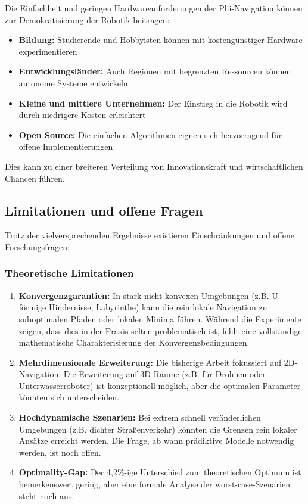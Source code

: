 ﻿\documentclass[a4paper,12pt]{article}
\theoremstyle{definition}
\begin{document}
Die Einfachheit und geringen Hardwareanforderungen der Phi-Navigation können zur Demokratisierung der Robotik beitragen:

\begin{itemize}
	\item \textbf{Bildung:} Studierende und Hobbyisten können mit kostengünstiger Hardware experimentieren
	\item \textbf{Entwicklungsländer:} Auch Regionen mit begrenzten Ressourcen können autonome Systeme entwickeln
	\item \textbf{Kleine und mittlere Unternehmen:} Der Einstieg in die Robotik wird durch niedrigere Kosten erleichtert
	\item \textbf{Open Source:} Die einfachen Algorithmen eignen sich hervorragend für offene Implementierungen
\end{itemize}

Dies kann zu einer breiteren Verteilung von Innovationskraft und wirtschaftlichen Chancen führen.

\subsection{Limitationen und offene Fragen}

Trotz der vielversprechenden Ergebnisse existieren Einschränkungen und offene Forschungsfragen:

\subsubsection{Theoretische Limitationen}

\begin{enumerate}
	\item \textbf{Konvergenzgarantien:} In stark nicht-konvexen Umgebungen (z.B. U-förmige Hindernisse, Labyrinthe) kann die rein lokale Navigation zu suboptimalen Pfaden oder lokalen Minima führen. Während die Experimente zeigen, dass dies in der Praxis selten problematisch ist, fehlt eine vollständige mathematische Charakterisierung der Konvergenzbedingungen.
	
	\item \textbf{Mehrdimensionale Erweiterung:} Die bisherige Arbeit fokussiert auf 2D-Navi\-gation. Die Erweiterung auf 3D-Räume (z.B. für Drohnen oder Unterwasserroboter) ist konzeptionell möglich, aber die optimalen Parameter könnten sich unterscheiden.
	
	\item \textbf{Hochdynamische Szenarien:} Bei extrem schnell veränderlichen Umgebungen (z.B. dichter Straßenverkehr) könnten die Grenzen rein lokaler Ansätze erreicht werden. Die Frage, ab wann prädiktive Modelle notwendig werden, ist noch offen.
	
	\item \textbf{Optimality-Gap:} Der 4{,}2\%-ige Unterschied zum theoretischen Optimum ist bemerkenswert gering, aber eine formale Analyse der worst-case-Szenarien steht noch aus.
\end{enumerate}
\end{document}
